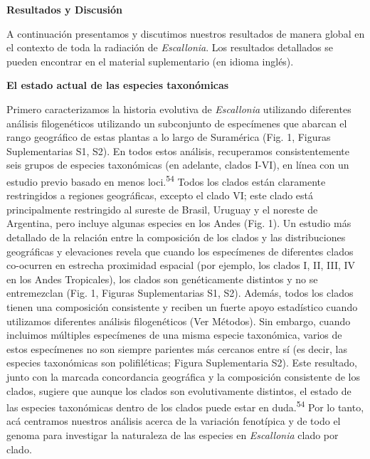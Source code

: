 \documentclass[
  11pt,
]{article}
\begin{document}
\textbf{Resultados y Discusión}

A continuación presentamos y discutimos nuestros resultados de manera global en el contexto de toda la radiación de \emph{Escallonia}. Los resultados detallados se pueden encontrar en el material suplementario (en idioma inglés).

\textbf{El estado actual de las especies taxonómicas}

Primero caracterizamos la historia evolutiva de \emph{Escallonia} utilizando diferentes análisis filogenéticos utilizando un subconjunto de especímenes que abarcan el rango geográfico de estas plantas a lo largo de Suramérica (Fig. 1, Figuras Suplementarias S1, S2). En todos estos análisis, recuperamos consistentemente seis grupos de especies taxonómicas (en adelante, clados I-VI), en línea con un estudio previo basado en menos loci.\textsuperscript{54} Todos los clados están claramente restringidos a regiones geográficas, excepto el clado VI; este clado está principalmente restringido al sureste de Brasil, Uruguay y el noreste de Argentina, pero incluye algunas especies en los Andes (Fig. 1). Un estudio más detallado de la relación entre la composición de los clados y las distribuciones geográficas y elevaciones revela que cuando los especímenes de diferentes clados co-ocurren en estrecha proximidad espacial (por ejemplo, los clados I, II, III, IV en los Andes Tropicales), los clados son genéticamente distintos y no se entremezclan (Fig. 1, Figuras Suplementarias S1, S2). Además, todos los clados tienen una composición consistente y reciben un fuerte apoyo estadístico cuando utilizamos diferentes análisis filogenéticos (Ver Métodos). Sin embargo, cuando incluimos múltiples especímenes de una misma especie taxonómica, varios de estos especímenes no son siempre parientes más cercanos entre sí (es decir, las especies taxonómicas son polifiléticas; Figura Suplementaria S2). Este resultado, junto con la marcada concordancia geográfica y la composición consistente de los clados, sugiere que aunque los clados son evolutivamente distintos, el estado de las especies taxonómicas dentro de los clados puede estar en duda.\textsuperscript{54} Por lo tanto, acá centramos nuestros análisis acerca de la variación fenotípica y de todo el genoma para investigar la naturaleza de las especies en \emph{Escallonia} clado por clado.
\end{document}
